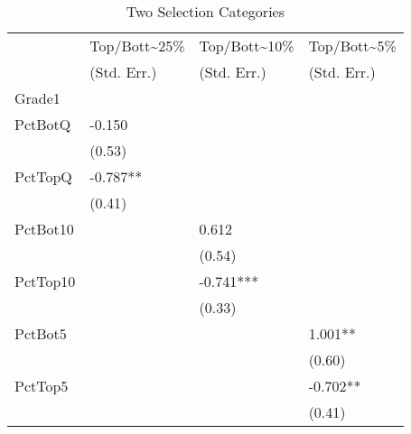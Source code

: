 \begin{table}[htb]
  \centering
  \begin{threeparttable}
    \caption{Two Selection Categories}\label{tab:2sc}
    \begin{tabular}{l l l l} 
      \hline
      \hline
               & Top/Bott{\textasciitilde}25\% & Top/Bott{\textasciitilde}10\% & Top/Bott{\textasciitilde}5\% \\
               & (Std. Err.)                   & (Std. Err.)                   & (Std. Err.)                  \\
      \hline
      Grade1   &                               &                               &                              \\
      PctBotQ  & -0.150                        &                               &                              \\
               & (0.53)                        &                               &                              \\
      PctTopQ  & -0.787**                      &                               &                              \\
               & (0.41)                        &                               &                              \\
      PctBot10 &                               & 0.612                         &                              \\
               &                               & (0.54)                        &                              \\
      PctTop10 &                               & -0.741***                     &                              \\
               &                               & (0.33)                        &                              \\
      PctBot5  &                               &                               & 1.001**                      \\
               &                               &                               & (0.60)                       \\
      PctTop5  &                               &                               & -0.702**                     \\
               &                               &                               & (0.41)                       \\
      \hline

\end{tabular}
\end{threeparttable}
\end{table}
